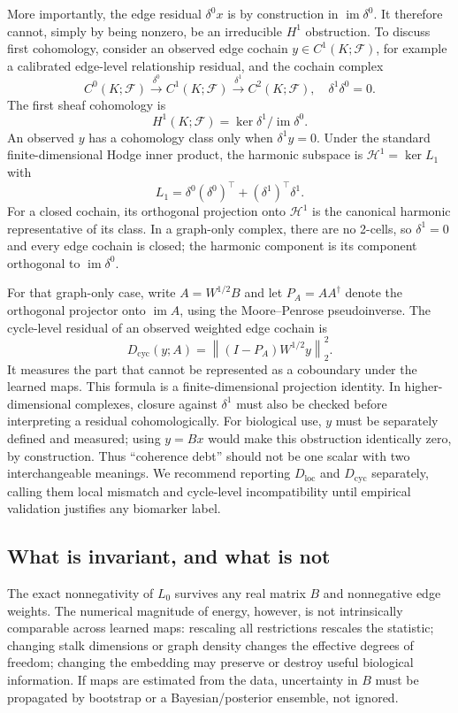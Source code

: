\documentclass[11pt]{article}
\newcommand{\norm}[1]{\left\lVert #1\right\rVert}
\begin{document}
More importantly, the edge residual $\delta^0x$ is by construction in $\operatorname{im}\delta^0$. It therefore cannot, simply by being nonzero, be an irreducible $H^1$ obstruction. To discuss first cohomology, consider an observed edge cochain $y\in C^1(K;\mathcal F)$, for example a calibrated edge-level relationship residual, and the cochain complex
\[
C^0(K;\mathcal F)\xrightarrow{\delta^0}C^1(K;\mathcal F)\xrightarrow{\delta^1}C^2(K;\mathcal F),\quad \delta^1\delta^0=0.
\]
The first sheaf cohomology is
\[
H^1(K;\mathcal F)=\ker\delta^1/\operatorname{im}\delta^0.
\]
An observed $y$ has a cohomology class only when $\delta^1y=0$. Under the standard finite-dimensional Hodge inner product, the harmonic subspace is $\mathcal H^1=\ker L_1$ with
\[
L_1=\delta^0(\delta^0)^\top+(\delta^1)^\top\delta^1.
\]
For a closed cochain, its orthogonal projection onto $\mathcal H^1$ is the canonical harmonic representative of its class. In a graph-only complex, there are no 2-cells, so $\delta^1=0$ and every edge cochain is closed; the harmonic component is its component orthogonal to $\operatorname{im}\delta^0$.

For that graph-only case, write $A=W^{1/2}B$ and let $P_A=AA^\dagger$ denote the orthogonal projector onto $\operatorname{im}A$, using the Moore--Penrose pseudoinverse. The cycle-level residual of an observed weighted edge cochain is
\[
D_{\mathrm{cyc}}(y;A)=\norm{(I-P_A)W^{1/2}y}_2^2.
\]
It measures the part that cannot be represented as a coboundary under the learned maps. This formula is a finite-dimensional projection identity. In higher-dimensional complexes, closure against $\delta^1$ must also be checked before interpreting a residual cohomologically. For biological use, $y$ must be separately defined and measured; using $y=Bx$ would make this obstruction identically zero, by construction. Thus “coherence debt” should not be one scalar with two interchangeable meanings. We recommend reporting $D_{\mathrm{loc}}$ and $D_{\mathrm{cyc}}$ separately, calling them local mismatch and cycle-level incompatibility until empirical validation justifies any biomarker label.

\subsection{What is invariant, and what is not}
The exact nonnegativity of $L_0$ survives any real matrix $B$ and nonnegative edge weights. The numerical magnitude of energy, however, is not intrinsically comparable across learned maps: rescaling all restrictions rescales the statistic; changing stalk dimensions or graph density changes the effective degrees of freedom; changing the embedding may preserve or destroy useful biological information. If maps are estimated from the data, uncertainty in $B$ must be propagated by bootstrap or a Bayesian/posterior ensemble, not ignored.
\end{document}
